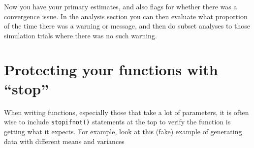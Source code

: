 \documentclass[
]{book}
\newenvironment{Shaded}{\begin{snugshade}}{\end{snugshade}}
\newcommand{\AttributeTok}[1]{\textcolor[rgb]{0.77,0.63,0.00}{#1}}
\newcommand{\CommentTok}[1]{\textcolor[rgb]{0.56,0.35,0.01}{\textit{#1}}}
\newcommand{\ControlFlowTok}[1]{\textcolor[rgb]{0.13,0.29,0.53}{\textbf{#1}}}
\newcommand{\DecValTok}[1]{\textcolor[rgb]{0.00,0.00,0.81}{#1}}
\newcommand{\FunctionTok}[1]{\textcolor[rgb]{0.00,0.00,0.00}{#1}}
\newcommand{\NormalTok}[1]{#1}
\newcommand{\OtherTok}[1]{\textcolor[rgb]{0.56,0.35,0.01}{#1}}
\newcommand{\SpecialCharTok}[1]{\textcolor[rgb]{0.00,0.00,0.00}{#1}}
\newcommand{\StringTok}[1]{\textcolor[rgb]{0.31,0.60,0.02}{#1}}
\begin{document}
\begin{Shaded}
\end{Shaded}

Now you have your primary estimates, and also flags for whether there was a convergence issue.
In the analysis section you can then evaluate what proportion of the time there was a warning or message, and then do subset analyses to those simulation trials where there was no such warning.

\hypertarget{about_stopifnot}{%
\section{Protecting your functions with ``stop''}\label{about_stopifnot}}

When writing functions, especially those that take a lot of parameters, it is often wise to include \texttt{stopifnot()} statements at the top to verify the function is getting what it expects.
For example, look at this (fake) example of generating data with different means and variances
\end{document}
